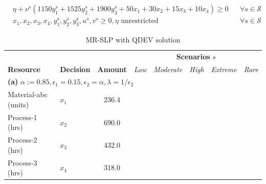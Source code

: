 \documentclass[7pt]{article}
\begin{document}
\begin{align*}
     & \eta + \nu^s \left(1150y_1^s + 1525y_2^s + 1900 y_3^s + 50 x_1 + 30 x_2 + 15 x_3 + 10 x_4\right) \geq 0                                                                                                                                                                                      &  & \forall s \in \mathcal{S} \\
     & x_1, x_2, x_3, x_4, y_1^s, y_2^s, y_3^s, u^s, v^s \geq 0, \eta \text{ unrestricted}                                                                                                                                                                                                          &  & \forall s \in \mathcal{S}
\end{align*}
\vspace{-2em}
\begin{table}[h!]
    \centering
    \footnotesize
    \caption{\small{MR-SLP with QDEV solution}}
    \begin{tabular}{ll|c|ccccc}
        \toprule
        \multicolumn{3}{l|}{} & \multicolumn{5}{c}{\textbf{Scenarios }$s$}                                                                                                         \\
        \textbf{Resource}     & \textbf{Decision}                          & \textbf{Amount} & \textit{Low} & \textit{Moderate} & \textit{High} & \textit{Extreme} & \textit{Rare} \\
        \midrule
        \multicolumn{8}{l}{\textbf{(a)} $\alpha := 0.85, \epsilon_1 = 0.15, \epsilon_2 = \alpha, \lambda = 1/\epsilon_2 $}                                                         \\
        \midrule
        Material-abc (units)  & $x_1$                                      & 236.4           &              &                   &               &                  &               \\
        Process-1 (hrs)       & $x_2$                                      & 690.0           &              &                   &               &                  &               \\
        Process-2 (hrs)       & $x_3$                                      & 432.0           &              &                   &               &                  &               \\
        Process-3 (hrs)       & $x_4$                                      & 318.0           &              &                   &               &                  &               \\

\end{tabular}
\end{table}
\end{document}
